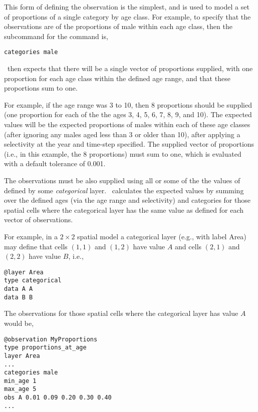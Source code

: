 This form of defining the observation is the simplest, and is used to model a set of proportions of a single category by age class. For example, to specify that the observations are of the proportions of male within each age class, then the subcommand  for the  command is,

{\small{\begin{verbatim}
categories male
\end{verbatim}}}

\iSAM\ then expects that there will be a single vector of proportions supplied, with one proportion for each age class within the defined age range, and that these proportions sum to one. 

For example, if the age range was 3 to 10, then 8 proportions should be supplied (one proportion for each of the the ages 3, 4, 5, 6, 7, 8, 9, and 10). The expected values will be the expected proportions of males within each of these age classes (after ignoring any males aged less than 3 or older than 10), after applying a selectivity at the year and time-step specified. The supplied vector of proportions (i.e., in this example, the 8 proportions) must sum to one, which is evaluated with a default tolerance of 0.001. 

The observations must be also supplied using all or some of the the values of defined by some \emph{categorical} layer. \iSAM\ calculates the expected values by summing over the defined ages (via the age range and selectivity) and categories for those spatial cells where the categorical layer has the same value as defined for each vector of observations.

For example, in a $2 \times 2$ spatial model a categorical layer (e.g., with label Area) may define that cells $(1,1)$ and $(1,2)$ have value $A$ and cells $(2,1)$ and $(2,2)$ have value $B$, i.e.,

{\small{\begin{verbatim}
@layer Area
type categorical
data A A 
data B B
\end{verbatim}}}

The observations for those spatial cells where the categorical layer has value $A$ would be, 

{\small{\begin{verbatim}
@observation MyProportions
type proportions_at_age
layer Area
...
categories male
min_age 1
max_age 5
obs A 0.01 0.09 0.20 0.30 0.40
...
\end{verbatim}}}

